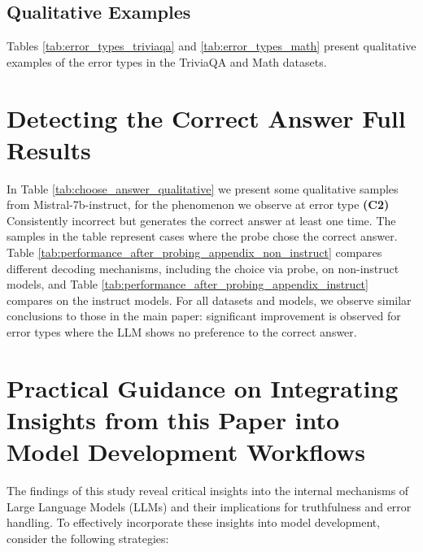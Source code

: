 \documentclass{article} %
\begin{document}

 

\subsection{Qualitative Examples}
\label{app:qualitative}

Tables \ref{tab:error_types_triviaqa} and \ref{tab:error_types_math} present qualitative examples of the error types in the TriviaQA and Math datasets.




\section{Detecting the Correct Answer Full Results}
\label{app:detecting_correct_answer}

In Table \ref{tab:choose_answer_qualitative} we present some qualitative samples from Mistral-7b-instruct, for the phenomenon we observe at error type \textbf{(C2)} Consistently incorrect but generates the correct answer at least one time.
The samples in the table represent cases where the probe chose the correct answer.
Table \ref{tab:performance_after_probing_appendix_non_instruct} compares different decoding mechanisms, including the choice via probe, on non-instruct models, and Table \ref{tab:performance_after_probing_appendix_instruct} compares on the instruct models.
For all datasets and models, we observe similar conclusions to those in the main paper: significant improvement is observed for error types where the LLM shows no preference to the correct answer.





\section{Practical Guidance on Integrating Insights from this Paper into Model Development Workflows}
\label{app:practical_guidance}

The findings of this study reveal critical insights into the internal mechanisms of Large Language Models (LLMs) and their implications for truthfulness and error handling. To effectively incorporate these insights into model development, consider the following strategies:
\end{document}
